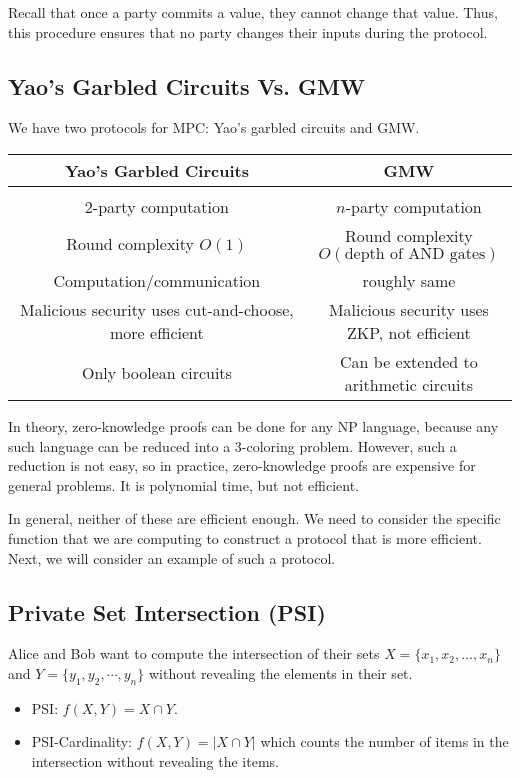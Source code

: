 Recall that once a party commits a value, they cannot change that value. Thus, this procedure ensures that no party changes their inputs during the protocol.

\subsection{Yao's Garbled Circuits Vs. GMW}

We have two protocols for MPC: Yao's garbled circuits and GMW.

\begin{center}
\begin{tabular}{c|c}
    \textbf{Yao's Garbled Circuits} & \textbf{GMW} \\
    \hline \\
    2-party computation & $n$-party computation \\
    Round complexity $O(1)$ & Round complexity $O(\text{depth of AND gates})$  \\
    Computation/communication & roughly same \\
    Malicious security uses cut-and-choose, more efficient & Malicious security uses ZKP, not efficient\\
    Only boolean circuits & Can be extended to arithmetic circuits
\end{tabular}
\end{center}

In theory, zero-knowledge proofs can be done for any NP language, because any such language can be reduced into a 3-coloring problem. However, such a reduction is not easy, so in practice, zero-knowledge proofs are expensive for general problems. It is polynomial time, but not efficient.

In general, neither of these are efficient enough. We need to consider the specific function that we are computing to construct a protocol that is more efficient. Next, we will consider an example of such a protocol.

\subsection{Private Set Intersection (PSI)}

Alice and Bob want to compute the intersection of their sets $X = \{x_1, x_2, \dots, x_n\}$ and $Y = \{y_1, y_2, \cdots, y_n\}$ without revealing the elements in their set.

\begin{itemize}
    \item PSI: $f(X, Y) = X\cap Y$.
    \item PSI-Cardinality: $f(X, Y) = |X\cap Y|$ which counts the number of items in the intersection without revealing the items.
\end{itemize}

